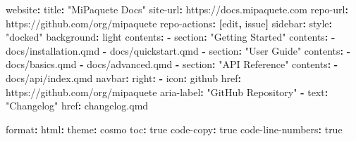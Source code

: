 \documentclass[
  doc,
  floatsintext,
  longtable,
  a4paper,
  nolmodern,
  notxfonts,
  notimes,
  12pt,
  colorlinks=true,linkcolor=blue,citecolor=blue,urlcolor=blue]{apa7}
\newenvironment{Shaded}{\begin{snugshade}}{\end{snugshade}}
\newcommand{\AttributeTok}[1]{\textcolor[rgb]{0.40,0.45,0.13}{#1}}
\newcommand{\CharTok}[1]{\textcolor[rgb]{0.13,0.47,0.30}{#1}}
\newcommand{\FunctionTok}[1]{\textcolor[rgb]{0.28,0.35,0.67}{#1}}
\newcommand{\KeywordTok}[1]{\textcolor[rgb]{0.00,0.23,0.31}{\textbf{#1}}}
\newcommand{\StringTok}[1]{\textcolor[rgb]{0.13,0.47,0.30}{#1}}
\begin{document}
\begin{Shaded}
\begin{Highlighting}[]
\FunctionTok{website}\KeywordTok{:}
\AttributeTok{  }\FunctionTok{title}\KeywordTok{:}\AttributeTok{ }\StringTok{"MiPaquete Docs"}
\AttributeTok{  }\FunctionTok{site{-}url}\KeywordTok{:}\AttributeTok{ https://docs.mipaquete.com}
\AttributeTok{  }\FunctionTok{repo{-}url}\KeywordTok{:}\AttributeTok{ https://github.com/org/mipaquete}
\AttributeTok{  }\FunctionTok{repo{-}actions}\KeywordTok{:}\AttributeTok{ }\KeywordTok{[}\AttributeTok{edit}\KeywordTok{,}\AttributeTok{ issue}\KeywordTok{]}
\AttributeTok{  }
\AttributeTok{  }\FunctionTok{sidebar}\KeywordTok{:}
\AttributeTok{    }\FunctionTok{style}\KeywordTok{:}\AttributeTok{ }\StringTok{"docked"}
\AttributeTok{    }\FunctionTok{background}\KeywordTok{:}\AttributeTok{ light}
\AttributeTok{    }\FunctionTok{contents}\KeywordTok{:}
\AttributeTok{      }\KeywordTok{{-}}\AttributeTok{ }\FunctionTok{section}\KeywordTok{:}\AttributeTok{ }\StringTok{"Getting Started"}
\AttributeTok{        }\FunctionTok{contents}\KeywordTok{:}
\AttributeTok{          }\KeywordTok{{-}}\AttributeTok{ docs/installation.qmd}
\AttributeTok{          }\KeywordTok{{-}}\AttributeTok{ docs/quickstart.qmd}
\AttributeTok{      }\KeywordTok{{-}}\AttributeTok{ }\FunctionTok{section}\KeywordTok{:}\AttributeTok{ }\StringTok{"User Guide"}
\AttributeTok{        }\FunctionTok{contents}\KeywordTok{:}
\AttributeTok{          }\KeywordTok{{-}}\AttributeTok{ docs/basics.qmd}
\AttributeTok{          }\KeywordTok{{-}}\AttributeTok{ docs/advanced.qmd}
\AttributeTok{      }\KeywordTok{{-}}\AttributeTok{ }\FunctionTok{section}\KeywordTok{:}\AttributeTok{ }\StringTok{"API Reference"}
\AttributeTok{        }\FunctionTok{contents}\KeywordTok{:}
\AttributeTok{          }\KeywordTok{{-}}\AttributeTok{ docs/api/index.qmd}
\AttributeTok{          }
\AttributeTok{  }\FunctionTok{navbar}\KeywordTok{:}
\AttributeTok{    }\FunctionTok{right}\KeywordTok{:}
\AttributeTok{      }\KeywordTok{{-}}\AttributeTok{ }\FunctionTok{icon}\KeywordTok{:}\AttributeTok{ github}
\AttributeTok{        }\FunctionTok{href}\KeywordTok{:}\AttributeTok{ https://github.com/org/mipaquete}
\AttributeTok{        }\FunctionTok{aria{-}label}\KeywordTok{:}\AttributeTok{ }\StringTok{"GitHub Repository"}
\AttributeTok{      }\KeywordTok{{-}}\AttributeTok{ }\FunctionTok{text}\KeywordTok{:}\AttributeTok{ }\StringTok{"Changelog"}
\AttributeTok{        }\FunctionTok{href}\KeywordTok{:}\AttributeTok{ changelog.qmd}

\FunctionTok{format}\KeywordTok{:}
\AttributeTok{  }\FunctionTok{html}\KeywordTok{:}
\AttributeTok{    }\FunctionTok{theme}\KeywordTok{:}\AttributeTok{ cosmo}
\AttributeTok{    }\FunctionTok{toc}\KeywordTok{:}\AttributeTok{ }\CharTok{true}
\AttributeTok{    }\FunctionTok{code{-}copy}\KeywordTok{:}\AttributeTok{ }\CharTok{true}
\AttributeTok{    }\FunctionTok{code{-}line{-}numbers}\KeywordTok{:}\AttributeTok{ }\CharTok{true}
\end{Highlighting}
\end{Shaded}
\end{document}
